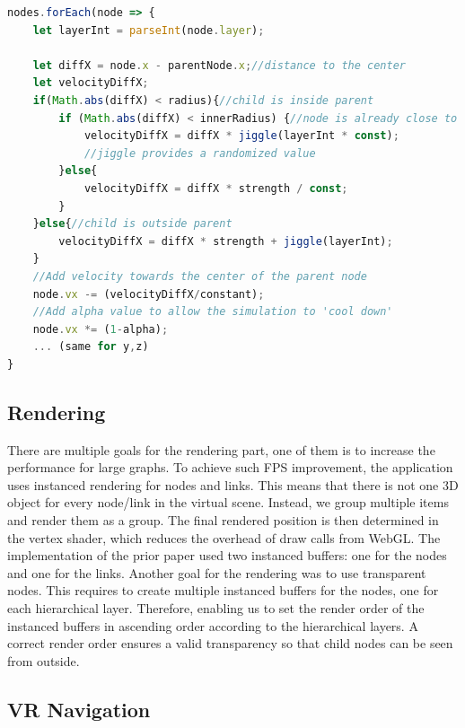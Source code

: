 \begin{lstlisting}[language=JavaScript,label={lst:sphericalConstraint},caption=Simplified algorithm for the spherical constraint. We apply adapted velocities whenever the child node is inside the parent. We further determine if the childnode is already closer to the center of the node or not.] 
nodes.forEach(node => {
    let layerInt = parseInt(node.layer);

    let diffX = node.x - parentNode.x;//distance to the center
    let velocityDiffX;
    if(Math.abs(diffX) < radius){//child is inside parent
        if (Math.abs(diffX) < innerRadius) {//node is already close to the center
            velocityDiffX = diffX * jiggle(layerInt * const);
            //jiggle provides a randomized value
        }else{
            velocityDiffX = diffX * strength / const;
        } 
    }else{//child is outside parent
        velocityDiffX = diffX * strength + jiggle(layerInt);
    }
    //Add velocity towards the center of the parent node
    node.vx -= (velocityDiffX/constant);
    //Add alpha value to allow the simulation to 'cool down'
    node.vx *= (1-alpha);
    ... (same for y,z)
}
\end{lstlisting}

\subsection{Rendering}
\label{sec:rendering}

There are multiple goals for the rendering part, one of them is to increase the performance for large graphs. 
To achieve such FPS improvement, the application uses instanced rendering for nodes and links. This means that there is not one 3D object for every node/link in the virtual scene. Instead, we group multiple items and render them as a group. The final rendered position is then determined in the vertex shader, which reduces the overhead of draw calls from WebGL.
The implementation of the prior paper \cite{sorger_immersive_2019} used two instanced buffers: one for the nodes and one for the links. 
Another goal for the rendering was to use transparent nodes. This requires to create multiple instanced buffers for the nodes, one for each hierarchical layer. 
Therefore, enabling us to set the render order of the instanced buffers in ascending order according to the hierarchical layers. A correct render order ensures  a valid transparency so that child nodes can be seen from outside.

\subsection{VR Navigation}
\label{sec:vrInteractions}

